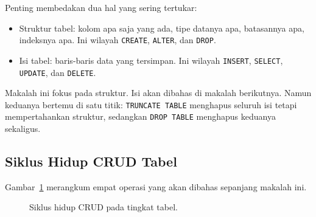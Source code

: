 \documentclass[11pt,a4paper]{article}
\begin{document}
Penting membedakan dua hal yang sering tertukar:

\begin{itemize}
	\item Struktur tabel: kolom apa saja yang ada, tipe datanya apa, batasannya apa, indeksnya apa. Ini wilayah \texttt{CREATE}, \texttt{ALTER}, dan \texttt{DROP}.
	\item Isi tabel: baris-baris data yang tersimpan. Ini wilayah \texttt{INSERT}, \texttt{SELECT}, \texttt{UPDATE}, dan \texttt{DELETE}.
\end{itemize}

Makalah ini fokus pada struktur. Isi akan dibahas di makalah berikutnya. Namun keduanya bertemu di satu titik: \texttt{TRUNCATE TABLE} menghapus seluruh isi tetapi mempertahankan struktur, sedangkan \texttt{DROP TABLE} menghapus keduanya sekaligus.

\subsection{Siklus Hidup CRUD Tabel}

Gambar~\ref{fig:crud-cycle} merangkum empat operasi yang akan dibahas sepanjang makalah ini.

\begin{figure}[H]
	\centering
	\caption{Siklus hidup CRUD pada tingkat tabel.}
	\label{fig:crud-cycle}
\end{figure}
\end{document}
